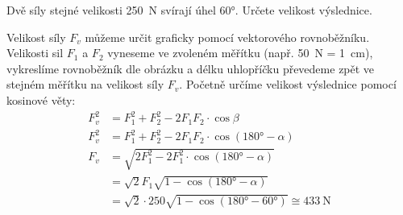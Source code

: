 \begin{mdframed}[style=mdexam]
  \begin{example}\label{fyz:fey_exam012}
    Dvě síly stejné velikosti \qty{250}{\newton} svírají úhel \ang{60}. Určete velikost výslednice.
        
    {\centering
    \captionsetup{type=figure}
    \par}
    
    Velikost síly \(F_v\) můžeme určit graficky pomocí vektorového rovnoběžníku. Velikosti sil
    \(F_1\) a \(F_2\) vyneseme ve zvoleném měřítku (např. \qty{50}{\newton} = \qty{1}{\cm}),
    vykreslíme rovnoběžník dle obrázku a délku uhlopříčku převedeme zpět ve stejném měřítku na
    velikost síly \(F_v\). Početně určíme velikost výslednice pomocí kosinové věty: 
    \begin{align*}
      F_v^2 &= F_1^2 + F_2^2 - 2F_1F_2\cdot\cos\beta               \\
      F_v^2 &= F_1^2 + F_2^2 - 2F_1F_2\cdot\cos(\ang{180}- \alpha) \\
      F_v   &= \sqrt{2F_1^2 - 2F_1^2\cdot\cos(\ang{180}- \alpha)}  \\
            &= \sqrt{2}F_1\sqrt{1-\cos(\ang{180}- \alpha)}         \\
            &= \sqrt{2}\cdot250\sqrt{1-\cos(\ang{180} - \ang{60})} 
               \cong \qty{433}{\newton}
    \end{align*}
  \end{example}
\end{mdframed}